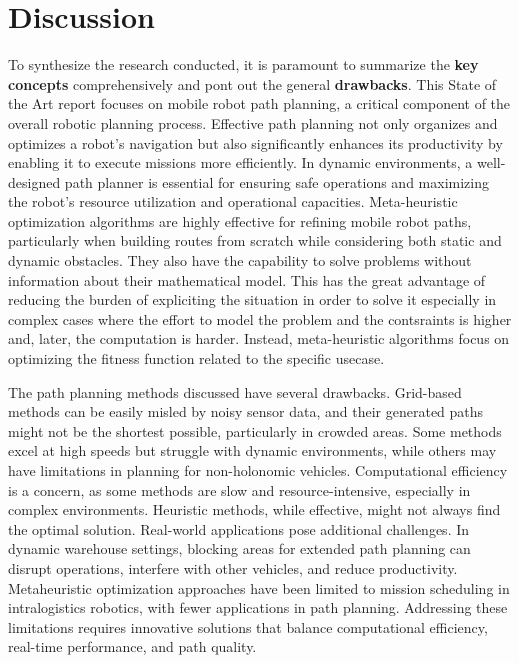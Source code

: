 \section{Discussion}
To synthesize the research conducted, it is paramount to summarize the \textbf{key concepts} comprehensively and 
pont out the general \textbf{drawbacks}. This 
State of the Art report focuses on mobile robot path planning, a critical component of the overall 
robotic planning process. Effective path planning not only organizes and optimizes a robot's navigation 
but also significantly enhances its productivity by enabling it to execute missions more efficiently. 
In dynamic environments, a well-designed path planner is essential for ensuring safe operations and 
maximizing the robot's resource utilization and operational capacities.
Meta-heuristic optimization algorithms are highly effective for refining mobile robot paths, particularly 
when building routes from scratch while considering both static and dynamic obstacles.
They also have the capability to solve problems without information about their mathematical model.
This has the great advantage of reducing the burden of expliciting the situation in order to solve it especially 
in complex cases where the effort to model the problem and the contsraints is higher and, later, the computation 
is harder. Instead, meta-heuristic algorithms focus on optimizing the fitness function related to the specific 
usecase. 

The path planning methods discussed have several drawbacks. Grid-based methods can be easily misled by noisy 
sensor data, and their generated paths might not be the shortest possible, particularly in crowded areas. 
Some methods excel at high speeds but struggle with dynamic environments, while others may have limitations 
in planning for non-holonomic vehicles. Computational efficiency is a concern, as some methods are slow and 
resource-intensive, especially in complex environments. Heuristic methods, while effective, might not always 
find the optimal solution. Real-world applications pose additional challenges. In dynamic warehouse settings, 
blocking areas for extended path planning can disrupt operations, interfere with other vehicles, and reduce 
productivity. Metaheuristic optimization approaches have been limited to mission scheduling in intralogistics 
robotics, with fewer applications in path planning. Addressing these limitations requires innovative solutions 
that balance computational efficiency, real-time performance, and path quality.


